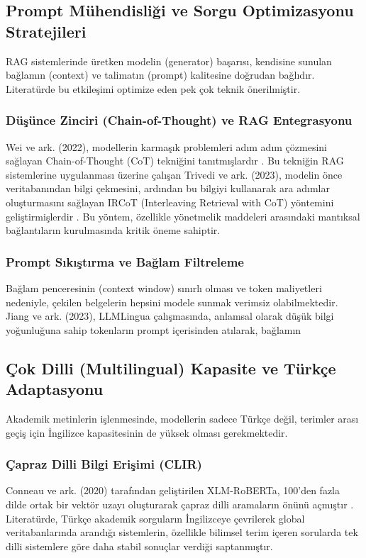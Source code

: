 \documentclass[12pt,a4paper]{report}
\begin{document}
\subsection{Prompt Mühendisliği ve Sorgu Optimizasyonu Stratejileri}
RAG sistemlerinde üretken modelin (generator) başarısı, kendisine sunulan bağlamın (context) ve talimatın (prompt) kalitesine doğrudan bağlıdır. Literatürde bu etkileşimi optimize eden pek çok teknik önerilmiştir.

\subsubsection{Düşünce Zinciri (Chain-of-Thought) ve RAG Entegrasyonu}
Wei ve ark. (2022), modellerin karmaşık problemleri adım adım çözmesini sağlayan Chain-of-Thought (CoT) tekniğini tanıtmışlardır \cite{wei2022chain}. Bu tekniğin RAG sistemlerine uygulanması üzerine çalışan Trivedi ve ark. (2023), modelin önce veritabanından bilgi çekmesini, ardından bu bilgiyi kullanarak ara adımlar oluşturmasını sağlayan IRCoT (Interleaving Retrieval with CoT) yöntemini geliştirmişlerdir \cite{trivedi2023interleaving}. Bu yöntem, özellikle yönetmelik maddeleri arasındaki mantıksal bağlantıların kurulmasında kritik öneme sahiptir.

\subsubsection{Prompt Sıkıştırma ve Bağlam Filtreleme}
Bağlam penceresinin (context window) sınırlı olması ve token maliyetleri nedeniyle, çekilen belgelerin hepsini modele sunmak verimsiz olabilmektedir. Jiang ve ark. (2023), LLMLingua çalışmasında, anlamsal olarak düşük bilgi yoğunluğuna sahip tokenların prompt içerisinden atılarak, bağlamın %

\subsection{Çok Dilli (Multilingual) Kapasite ve Türkçe Adaptasyonu}
Akademik metinlerin işlenmesinde, modellerin sadece Türkçe değil, terimler arası geçiş için İngilizce kapasitesinin de yüksek olması gerekmektedir.

\subsubsection{Çapraz Dilli Bilgi Erişimi (CLIR)}
Conneau ve ark. (2020) tarafından geliştirilen XLM-RoBERTa, 100'den fazla dilde ortak bir vektör uzayı oluşturarak çapraz dilli aramaların önünü açmıştır \cite{conneau2019unsupervised}. Literatürde, Türkçe akademik sorguların İngilizceye çevrilerek global veritabanlarında arandığı sistemlerin, özellikle bilimsel terim içeren sorularda tek dilli sistemlere göre daha stabil sonuçlar verdiği saptanmıştır.
\end{document}
